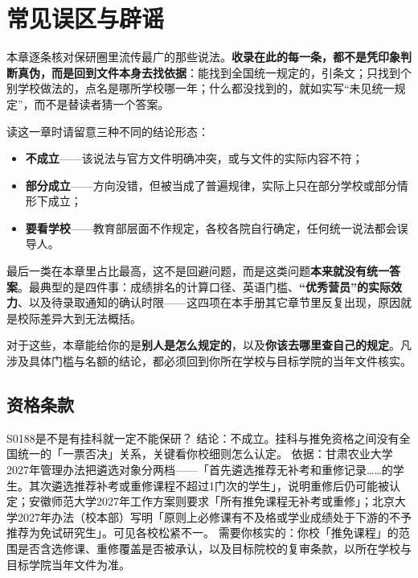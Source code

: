 \chapter{常见误区与辟谣}
\label{ch19}
\begin{keybox}
本章逐条核对保研圈里流传最广的那些说法。\textbf{收录在此的每一条，都不是凭印象判断真伪，而是回到文件本身去找依据}：能找到全国统一规定的，引条文；只找到个别学校做法的，点名是哪所学校哪一年；什么都没找到的，就如实写“未见统一规定”，而不是替读者猜一个答案。

读这一章时请留意三种不同的结论形态：

\begin{itemize}
  \item \textbf{不成立}——该说法与官方文件明确冲突，或与文件的实际内容不符；
  \item \textbf{部分成立}——方向没错，但被当成了普遍规律，实际上只在部分学校或部分情形下成立；
  \item \textbf{要看学校}——教育部层面不作规定，各校各院自行确定，任何统一说法都会误导人。
\end{itemize}

最后一类在本章里占比最高，这不是回避问题，而是这类问题\textbf{本来就没有统一答案}。最典型的是四件事：成绩排名的计算口径、英语门槛、\textbf{“优秀营员”的实际效力}、以及待录取通知的确认时限——这四项在本手册其它章节里反复出现，原因就是校际差异大到无法概括。

对于这些，本章能给你的是\textbf{别人是怎么规定的}，以及\textbf{你该去哪里查自己的规定}。凡涉及具体门槛与名额的结论，都必须回到你所在学校与目标学院的当年文件核实。
\end{keybox}

\section{资格条款}
\begin{qa}{S0188}{是不是有挂科就一定不能保研？}
结论：不成立。挂科与推免资格之间没有全国统一的「一票否决」关系，关键看你校细则怎么认定。
依据：甘肃农业大学2027年管理办法把遴选对象分两档——「首先遴选推荐无补考和重修记录……的学生。其次遴选推荐补考或重修课程不超过1门次的学生」，说明重修后仍可能被认定；安徽师范大学2027年工作方案则要求「所有推免课程无补考或重修」；北京大学2027年办法（校本部）写明「原则上必修课有不及格或学业成绩处于下游的不予推荐为免试研究生」。可见各校松紧不一。
需要你核实的：你校「推免课程」的范围是否含选修课、重修覆盖是否被承认，以及目标院校的复审条款，以所在学校与目标学院当年文件为准。
\end{qa}


